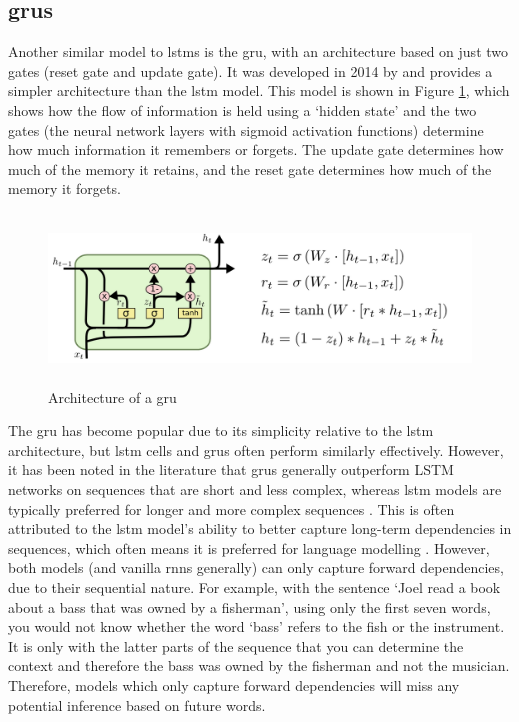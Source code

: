 \subsection{\acrlong{gru}s}\label{sec:background_grus}
Another similar model to \acrshort{lstm}s is the \acrfull {gru}, with an architecture based on just two gates (reset gate and update gate). It was developed in 2014 by \citet{cho2014learning} and provides a simpler architecture than the \acrshort{lstm} model. This model is shown in Figure \ref{fig:gru_architecture}, which shows how the flow of information is held using a `hidden state' and the two gates (the neural network layers with sigmoid activation functions) determine how much information it remembers or forgets. The update gate determines how much of the memory it retains, and the reset gate determines how much of the memory it forgets.

\begin{figure}[h]
    \centering
    \includegraphics[height=4.5cm,trim={0 0 12cm 0cm},clip]{paper/images/gru.png}
    \caption{Architecture of a \acrlong{gru} \citep{olah2015understanding}}
    \label{fig:gru_architecture}
\end{figure}

The \acrlong{gru} has become popular due to its simplicity relative to the \acrshort{lstm} architecture, but \acrshort{lstm} cells and \acrshort{gru}s often perform similarly effectively. However, it has been noted in the literature that \acrshort{gru}s generally outperform LSTM networks on sequences that are short and less complex, whereas \acrshort{lstm} models are typically preferred for longer and more complex sequences \citep{cahuantzi2023comparison}. This is often attributed to the \acrshort{lstm} model's ability to better capture long-term dependencies in sequences, which often means it is preferred for language modelling \citep{Irie2016}. However, both models (and vanilla \acrshort{rnn}s generally) can only capture forward dependencies, due to their sequential nature. For example, with the sentence `Joel read a book about a bass that was owned by a fisherman', using only the first seven words, you would not know whether the word `bass' refers to the fish or the instrument. It is only with the latter parts of the sequence that you can determine the context and therefore the bass was owned by the fisherman and not the musician. Therefore, models which only capture forward dependencies will miss any potential inference based on future words. 

